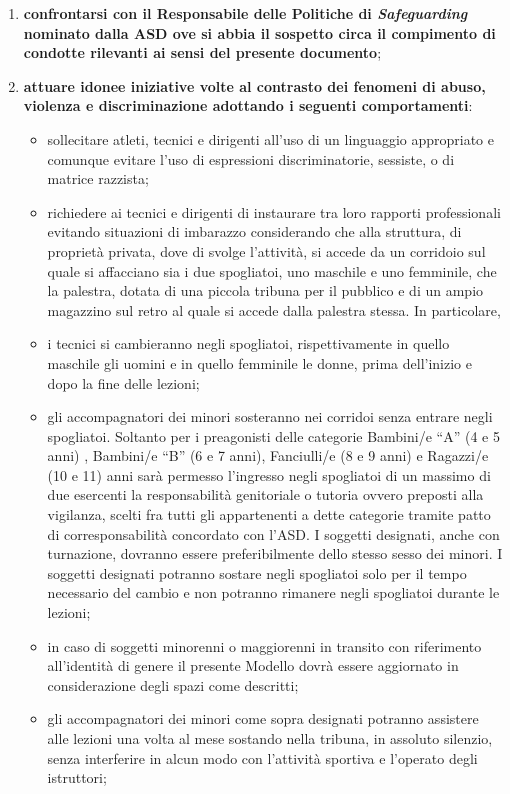 \documentclass{djtsasddoc}
\begin{document}
\begin{enumerate}
\begin{enumerate}
			\item \textbf{confrontarsi con il Responsabile delle Politiche di \textit{Safeguarding} nominato dalla ASD ove si abbia il sospetto circa il compimento di condotte rilevanti ai sensi del presente documento};
			\item \textbf{attuare idonee iniziative volte al contrasto dei fenomeni di abuso, violenza e discriminazione adottando i seguenti comportamenti}:
			\begin{itemize}
				\item sollecitare atleti, tecnici e dirigenti all'uso di un linguaggio appropriato e comunque evitare l'uso di espressioni discriminatorie, sessiste, o di matrice razzista;
				\item richiedere ai tecnici e dirigenti di instaurare tra loro rapporti professionali evitando situazioni di imbarazzo considerando che alla struttura, di proprietà privata, dove di svolge l'attività, si accede da un corridoio sul quale si affacciano sia i due spogliatoi, uno maschile e uno femminile, che la palestra, dotata di una piccola tribuna per il pubblico e di un ampio magazzino sul retro al quale si accede dalla palestra stessa. In particolare, 
				\item i tecnici si cambieranno negli spogliatoi, rispettivamente in quello maschile gli uomini e in quello femminile le donne, prima dell'inizio e dopo la fine delle lezioni;
				\item gli accompagnatori dei minori sosteranno nei corridoi senza entrare negli spogliatoi. Soltanto per i preagonisti delle categorie Bambini/e “A” (4 e 5 anni) , Bambini/e “B” (6 e 7 anni), Fanciulli/e (8 e 9 anni) e Ragazzi/e (10 e 11) anni sarà permesso l'ingresso negli spogliatoi di un massimo di due esercenti la responsabilità genitoriale o tutoria ovvero preposti alla vigilanza, scelti fra tutti gli appartenenti a dette categorie tramite patto di corresponsabilità concordato con l'ASD. I soggetti designati, anche con turnazione, dovranno essere preferibilmente dello stesso sesso dei minori. I soggetti designati potranno sostare negli spogliatoi solo per il tempo necessario del cambio e non potranno rimanere negli spogliatoi durante le lezioni;
				\item in caso di soggetti minorenni o maggiorenni in transito con riferimento all'identità di genere il presente Modello dovrà essere aggiornato in considerazione degli spazi come descritti;
				\item gli accompagnatori dei minori come sopra designati potranno assistere alle lezioni una volta al mese sostando nella tribuna, in assoluto silenzio, senza interferire in alcun modo con l'attività sportiva e l'operato degli istruttori;

\end{itemize}
\end{enumerate}
\end{enumerate}
\end{document}
